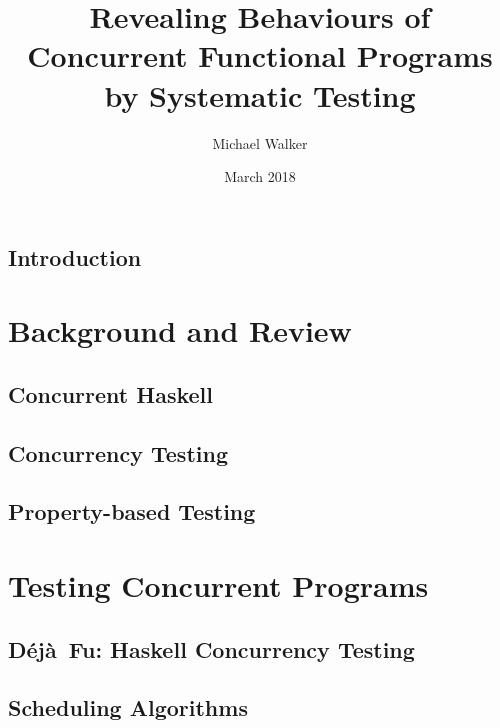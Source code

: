 \documentclass[openright,imperial,11pt]{octavo}
\title{Revealing Behaviours of Concurrent Functional Programs by Systematic Testing}
\author{Michael Walker}
\date{March 2018}
\newcommand{\dejafu}{D\'{e}j\`{a}~Fu}
\begin{document}
\pagestyle{plain}

\makeatletter\@openrightfalse\makeatother



\cleardoublepage

\makeatletter\@openrighttrue\makeatother

\pagestyle{headings}

\chapter{Introduction}
\label{chp:introduction}


\part{Background and Review}
\label{part:review}

\chapter{Concurrent Haskell}
\label{chp:concurrent_haskell}


\chapter{Concurrency Testing}
\label{chp:sct}


\chapter{Property-based Testing}
\label{chp:property_testing}


\part{Testing Concurrent Programs}
\label{part:testing}

\chapter{\dejafu{}: Haskell Concurrency Testing}
\label{chp:dejafu}


\chapter{Scheduling Algorithms}
\label{chp:algorithms}

\end{document}
